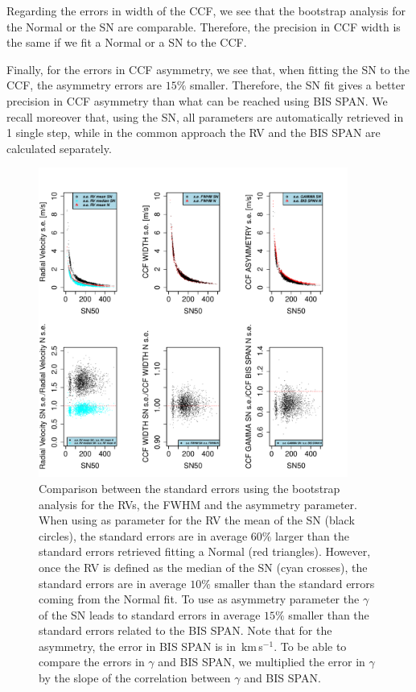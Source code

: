 \documentclass[11pt, oneside]{article}
\def\kms{\hbox{\,km\,s$^{-1}$}}       %
\begin{document}
Regarding the errors in width of the CCF, we see that the bootstrap analysis for the Normal or the SN are comparable. Therefore, the precision in CCF width is the same if we fit a Normal or a SN to the CCF.

Finally, for the errors in CCF asymmetry, we see that, when fitting the SN to the CCF, the asymmetry errors are $15\%$ smaller. Therefore, the SN fit gives a better precision in CCF asymmetry than what can be reached using BIS SPAN. We recall moreover that, using the SN, all parameters are automatically retrieved in 1 single step, while in the common approach the RV and the BIS SPAN are calculated separately.

%
\begin{figure}[htbp]
   \centering
\includegraphics[height = 4in]{[5]Errors_vs_SNR_all_stars.pdf} 
   \caption{Comparison between the standard errors using the bootstrap analysis for the RVs, the FWHM and the asymmetry parameter. When using as parameter for the RV the mean of the SN (black circles), the standard errors are in average $60\%$ larger than the standard errors retrieved fitting a Normal (red triangles). However, once the RV is defined as the median of the SN (cyan crosses), the standard errors are in average $10\%$ smaller than the standard errors coming from the Normal fit. To use as asymmetry parameter the $\gamma$ of the SN leads to standard errors in average $15\%$ smaller than the standard errors related to the BIS SPAN. Note that for the asymmetry, the error in BIS SPAN is in \kms. To be able to compare the errors in $\gamma$ and BIS SPAN, we multiplied the error in $\gamma$ by the slope of the correlation between $\gamma$ and BIS SPAN.}
   \label{fig:se}
\end{figure}
\end{document}
